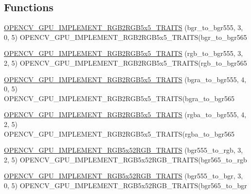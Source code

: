 \subsection*{Functions}
\begin{DoxyCompactItemize}
\item 
\hyperlink{namespacecv_1_1gpu_1_1device_aaf39bfc4613daed434166d5ae8f43852}{O\-P\-E\-N\-C\-V\-\_\-\-G\-P\-U\-\_\-\-I\-M\-P\-L\-E\-M\-E\-N\-T\-\_\-\-R\-G\-B2\-R\-G\-B5x5\-\_\-\-T\-R\-A\-I\-T\-S} (bgr\-\_\-to\-\_\-bgr555, 3, 0, 5) O\-P\-E\-N\-C\-V\-\_\-\-G\-P\-U\-\_\-\-I\-M\-P\-L\-E\-M\-E\-N\-T\-\_\-\-R\-G\-B2\-R\-G\-B5x5\-\_\-\-T\-R\-A\-I\-T\-S(bgr\-\_\-to\-\_\-bgr565
\item 
\hyperlink{namespacecv_1_1gpu_1_1device_aea412db822ff912186ab73664d06af53}{O\-P\-E\-N\-C\-V\-\_\-\-G\-P\-U\-\_\-\-I\-M\-P\-L\-E\-M\-E\-N\-T\-\_\-\-R\-G\-B2\-R\-G\-B5x5\-\_\-\-T\-R\-A\-I\-T\-S} (rgb\-\_\-to\-\_\-bgr555, 3, 2, 5) O\-P\-E\-N\-C\-V\-\_\-\-G\-P\-U\-\_\-\-I\-M\-P\-L\-E\-M\-E\-N\-T\-\_\-\-R\-G\-B2\-R\-G\-B5x5\-\_\-\-T\-R\-A\-I\-T\-S(rgb\-\_\-to\-\_\-bgr565
\item 
\hyperlink{namespacecv_1_1gpu_1_1device_a1b7dd5dda4a46c8f0c3c86dfb56ede5f}{O\-P\-E\-N\-C\-V\-\_\-\-G\-P\-U\-\_\-\-I\-M\-P\-L\-E\-M\-E\-N\-T\-\_\-\-R\-G\-B2\-R\-G\-B5x5\-\_\-\-T\-R\-A\-I\-T\-S} (bgra\-\_\-to\-\_\-bgr555, 4, 0, 5) O\-P\-E\-N\-C\-V\-\_\-\-G\-P\-U\-\_\-\-I\-M\-P\-L\-E\-M\-E\-N\-T\-\_\-\-R\-G\-B2\-R\-G\-B5x5\-\_\-\-T\-R\-A\-I\-T\-S(bgra\-\_\-to\-\_\-bgr565
\item 
\hyperlink{namespacecv_1_1gpu_1_1device_ad3681fe153f6a9bfc2a537bb4f710566}{O\-P\-E\-N\-C\-V\-\_\-\-G\-P\-U\-\_\-\-I\-M\-P\-L\-E\-M\-E\-N\-T\-\_\-\-R\-G\-B2\-R\-G\-B5x5\-\_\-\-T\-R\-A\-I\-T\-S} (rgba\-\_\-to\-\_\-bgr555, 4, 2, 5) O\-P\-E\-N\-C\-V\-\_\-\-G\-P\-U\-\_\-\-I\-M\-P\-L\-E\-M\-E\-N\-T\-\_\-\-R\-G\-B2\-R\-G\-B5x5\-\_\-\-T\-R\-A\-I\-T\-S(rgba\-\_\-to\-\_\-bgr565
\item 
\hyperlink{namespacecv_1_1gpu_1_1device_ad8dbb3b208fb9aebe138d4e6b2b00231}{O\-P\-E\-N\-C\-V\-\_\-\-G\-P\-U\-\_\-\-I\-M\-P\-L\-E\-M\-E\-N\-T\-\_\-\-R\-G\-B5x52\-R\-G\-B\-\_\-\-T\-R\-A\-I\-T\-S} (bgr555\-\_\-to\-\_\-rgb, 3, 2, 5) O\-P\-E\-N\-C\-V\-\_\-\-G\-P\-U\-\_\-\-I\-M\-P\-L\-E\-M\-E\-N\-T\-\_\-\-R\-G\-B5x52\-R\-G\-B\-\_\-\-T\-R\-A\-I\-T\-S(bgr565\-\_\-to\-\_\-rgb
\item 
\hyperlink{namespacecv_1_1gpu_1_1device_a492699352169d174d993a5d483d11d91}{O\-P\-E\-N\-C\-V\-\_\-\-G\-P\-U\-\_\-\-I\-M\-P\-L\-E\-M\-E\-N\-T\-\_\-\-R\-G\-B5x52\-R\-G\-B\-\_\-\-T\-R\-A\-I\-T\-S} (bgr555\-\_\-to\-\_\-bgr, 3, 0, 5) O\-P\-E\-N\-C\-V\-\_\-\-G\-P\-U\-\_\-\-I\-M\-P\-L\-E\-M\-E\-N\-T\-\_\-\-R\-G\-B5x52\-R\-G\-B\-\_\-\-T\-R\-A\-I\-T\-S(bgr565\-\_\-to\-\_\-bgr

\end{DoxyCompactItemize}
